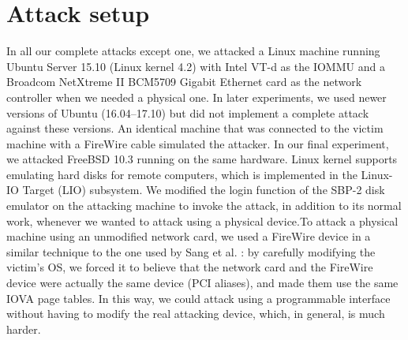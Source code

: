 \section{Attack setup}
In all our complete attacks except one, we attacked a Linux machine running Ubuntu Server 15.10 (Linux kernel 4.2) with Intel VT-d as the IOMMU and a Broadcom NetXtreme II BCM5709 Gigabit Ethernet card as the network controller when we needed a physical one. In later experiments, we used newer versions of Ubuntu (16.04–17.10) but did not implement a complete attack against these versions. An identical machine that was connected to the victim machine with a FireWire cable simulated the attacker. In our final experiment, we attacked FreeBSD 10.3 running on the same hardware.  Linux kernel supports emulating hard disks for remote computers, which is implemented in the Linux-IO Target (LIO) subsystem. We modified the login function of the SBP-2 disk emulator on the attacking machine to invoke the attack, in addition to its normal work, whenever we wanted to attack using a physical device.To attack a physical machine using an unmodified network card, we used a FireWire device in a similar technique to the one used by Sang et al. \cite{SLND10}: by carefully modifying the victim’s OS, we forced it to believe that the network card and the FireWire device were actually the same device (PCI aliases), and made them use the same IOVA page tables. In this way, we could attack using a programmable interface without having to modify the real attacking device, which, in general, is much harder.
